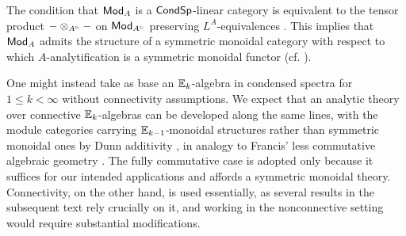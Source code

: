 \begin{remark}\label{rmk: conditions on analytic modules}
    The condition that $\mathsf{Mod}_{A}$ is a $\mathsf{Cond}\mathsf{Sp}$-linear category is equivalent to the tensor product $-\otimes_{A^{\tri}}-$ on $\Mod_{A^{\tri}}$ preserving $L^{A}$-equivalences \cite[Lem. 7.5]{RagimovReflection}. This implies that $\mathsf{Mod}_{A}$ admits the structure of a symmetric monoidal category with respect to which $A$-analytification is a symmetric monoidal functor (cf. ). 
\end{remark}
\begin{remark}\label{rmk: Ek and nonconnective}
    One might instead take as base an $\mathbb{E}_{k}$-algebra in condensed spectra for $1\leq k<\infty$ without connectivity assumptions. We expect that an analytic theory over connective $\mathbb{E}_{k}$-algebras can be developed along the same lines, with the module categories carrying $\mathbb{E}_{k-1}$-monoidal structures rather than symmetric monoidal ones by Dunn additivity \cite[Cor. 5.1.2.6]{HA}, in analogy to Francis' less commutative algebraic geometry \cite{FrancisThesis}. The fully commutative case is adopted only because it suffices for our intended applications and affords a symmetric monoidal theory. Connectivity, on the other hand, is used essentially, as several results in the subsequent text rely crucially on it, and working in the nonconnective setting would require substantial modifications. 
\end{remark}
